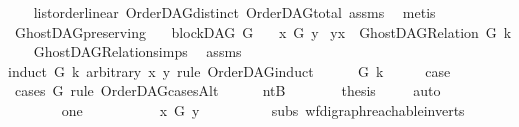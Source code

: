 \begin{isabellebody}
\ \ \isamarkupfalse%
\ list{\isacharunderscore}{\kern0pt}order{\isacharunderscore}{\kern0pt}linear\ OrderDAG{\isacharunderscore}{\kern0pt}distinct\ OrderDAG{\isacharunderscore}{\kern0pt}total\ assms\ \isamarkupfalse%
\ metis%
\endisatagproof
{\isafoldproof}%
%
\isadelimproof
\isanewline
%
\endisadelimproof
\isanewline
{}\isamarkupfalse%
\ GhostDAG{\isacharunderscore}{\kern0pt}preserving{\isacharcolon}{\kern0pt}\isanewline
\ \ \ {\isachardoublequoteopen}blockDAG\ G{\isachardoublequoteclose}\isanewline
\ \ \ {\isachardoublequoteopen}x\ {\isasymrightarrow}\isactrlsup {\isacharplus}{\kern0pt}\isactrlbsub G\isactrlesub \ y{\isachardoublequoteclose}\isanewline
{}\ {\isachardoublequoteopen}{\isacharparenleft}{\kern0pt}y{\isacharcomma}{\kern0pt}x{\isacharparenright}{\kern0pt}\ {\isasymin}\ GhostDAG{\isacharunderscore}{\kern0pt}Relation\ G\ k{\isachardoublequoteclose}\isanewline
%
\isadelimproof
\ \ %
\endisadelimproof
%
\isatagproof
{}\isamarkupfalse%
\ GhostDAG{\isacharunderscore}{\kern0pt}Relation{\isachardot}{\kern0pt}simps\ \isamarkupfalse%
\ assms\ \isanewline
{}\isamarkupfalse%
{\isacharparenleft}{\kern0pt}induct\ G\ k\ arbitrary{\isacharcolon}{\kern0pt}\ x\ y\ rule{\isacharcolon}{\kern0pt}\ OrderDAG{\isachardot}{\kern0pt}induct\ {\isacharparenright}{\kern0pt}\isanewline
\ \ \isamarkupfalse%
\ {\isacharparenleft}{\kern0pt}{}\ G\ k{\isacharparenright}{\kern0pt}\isanewline
\ \ \isamarkupfalse%
\ \isamarkupfalse%
\ {\isacharquery}{\kern0pt}case\ \isamarkupfalse%
\ {\isacharparenleft}{\kern0pt}cases\ G\ rule{\isacharcolon}{\kern0pt}\ OrderDAG{\isacharunderscore}{\kern0pt}casesAlt{\isacharparenright}{\kern0pt}\isanewline
\ \ \ \ \isamarkupfalse%
\ ntB\isanewline
\ \ \ \ \isamarkupfalse%
\ \isamarkupfalse%
\ {\isacharquery}{\kern0pt}thesis\ \isamarkupfalse%
\ {}\ \isamarkupfalse%
\ auto\isanewline
\ \ \ \ \isamarkupfalse%
\isanewline
\ \ \ \ \ \ \isamarkupfalse%
\ one\isanewline
\ \ \ \ \ \ \isamarkupfalse%
\ \isamarkupfalse%
\ {\isachardoublequoteopen}{\isasymnot}\ x\ {\isasymrightarrow}\isactrlsup {\isacharplus}{\kern0pt}\isactrlbsub G\isactrlesub \ y{\isachardoublequoteclose}\isanewline
\ \ \ \ \ \ \ \ \isamarkupfalse%
\ subs\ wf{\isacharunderscore}{\kern0pt}digraph{\isachardot}{\kern0pt}reachable{}{\isacharunderscore}{\kern0pt}in{\isacharunderscore}{\kern0pt}verts\ {}\isanewline

\end{isabellebody}
